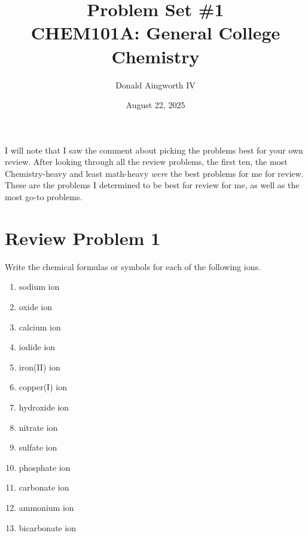 \documentclass[10pt]{article}
\title{
    Problem Set \#1
    \\  \small
    CHEM101A: General College Chemistry
    }
\author{Donald Aingworth IV}
\date{August 22, 2025}
\begin{document}
    \maketitle

    I will note that I saw the comment about picking the problems best for your own review.
    After looking through all the review problems, the first ten, the most Chemistry-heavy and least math-heavy \textit{were} the best problems for me for review. 
    These are the problems I determined to be best for review for me, as well as the most go-to problems.

    \pagebreak
    \section{Review Problem 1}
        Write the chemical formulas or symbols for each of the following ions.
        \begin{multicols}{3}
            \begin{enumerate}[label=\alph*)]
                \item   sodium ion 
                \item   oxide ion 
                \item   calcium ion 
                \item   iodide ion
                \item   iron(II) ion 
                \item   copper(I) ion 
                \item   hydroxide ion 
                \item   nitrate ion
                \item   sulfate ion 
                \item   phosphate ion 
                \item   carbonate ion 
                \item   ammonium ion
                \item   bicarbonate ion
            \end{enumerate}
        \end{multicols}
\end{document}
